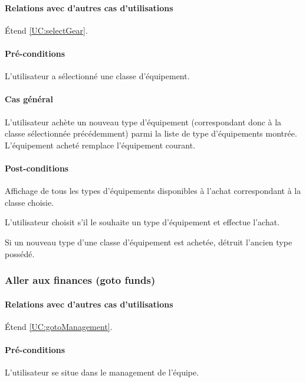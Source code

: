 \paragraph{Relations avec d'autres cas d'utilisations}
Étend \ref{UC:selectGear}.
\paragraph{Pré-conditions}
\begin{list}{}{\leftmargin=1.5em}
\item{L'utilisateur a sélectionné une classe d'équipement.}
\end{list}
\paragraph{Cas général}
L'utilisateur achète un nouveau type d'équipement (correspondant donc à la classe sélectionnée précédemment) parmi la liste de type d'équipements montrée. L'équipement acheté remplace l'équipement courant. 
\paragraph{Post-conditions}
\begin{list}{}{\leftmargin=1.5em}
\item{Affichage de tous les types d'équipements disponibles à l'achat correspondant à la classe choisie.}
\item{L'utilisateur choisit s'il le souhaite un type d'équipement et effectue l'achat.}
\item{Si un nouveau type d'une classe d'équipement est achetée, détruit l'ancien type possédé.}
\end{list}

\subsubsection{Aller aux finances (goto funds)}
\label{UC:gotoFunds}
\paragraph{Relations avec d'autres cas d'utilisations}
Étend \ref{UC:gotoManagement}.
\paragraph{Pré-conditions}
\begin{list}{}{\leftmargin=1.5em}
\item{L'utilisateur se situe dans le management de l'équipe.}
\end{list}
